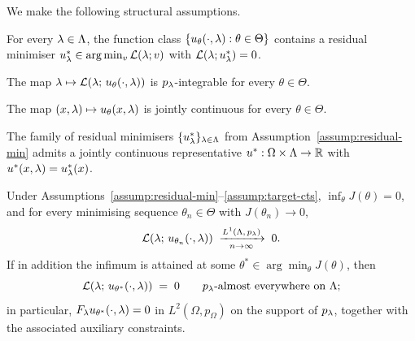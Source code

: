 \documentclass[12pt,a4paper]{extarticle}
\begin{document}
We make the following structural assumptions.

\begin{assumption}\label{assump:residual-min}
For every $\lambda \in \Lambda$, the function class $\{u_\theta(\cdot, \lambda) : \theta \in \Theta\}$ contains a residual minimiser $u_\lambda^* \in \arg\min_v \mathcal{L}(\lambda; v)$ with $\mathcal{L}(\lambda; u_\lambda^*) = 0$.
\end{assumption}

\begin{assumption}\label{assump:integrability}
The map $\lambda \mapsto \mathcal{L}(\lambda;\, u_\theta(\cdot, \lambda))$ is $p_\lambda$-integrable for every $\theta \in \Theta$.
\end{assumption}

\begin{assumption}\label{assump:joint-cts}
The map $(x, \lambda) \mapsto u_\theta(x, \lambda)$ is jointly continuous for every $\theta \in \Theta$.
\end{assumption}

\begin{assumption}\label{assump:target-cts}
The family of residual minimisers $\{u_\lambda^*\}_{\lambda \in \Lambda}$ from Assumption~\ref{assump:residual-min} admits a jointly continuous representative $u^*: \Omega \times \Lambda \to \mathbb{R}$ with $u^*(x, \lambda) = u_\lambda^*(x)$.
\end{assumption}

\begin{proposition}\label{prop:lambda-invariance}
Under Assumptions~\ref{assump:residual-min}--\ref{assump:target-cts}, $\inf_\theta J(\theta) = 0$, and for every minimising sequence $\theta_n \in \Theta$ with $J(\theta_n) \to 0$,
\begin{equation*}
    \mathcal{L}(\lambda;\, u_{\theta_n}(\cdot, \lambda)) \;\xrightarrow[n \to \infty]{L^1(\Lambda,\, p_\lambda)} \; 0.
\end{equation*}
If in addition the infimum is attained at some $\theta^* \in \arg\min_\theta J(\theta)$, then
\begin{equation*}
    \mathcal{L}(\lambda;\, u_{\theta^*}(\cdot, \lambda)) \;=\; 0
    \qquad p_\lambda\text{-almost everywhere on } \Lambda;
\end{equation*}
in particular, $F_\lambda u_{\theta^*}(\cdot, \lambda) = 0$ in $L^2(\Omega, p_\Omega)$ on the support of $p_\lambda$, together with the associated auxiliary constraints.
\end{proposition}
\end{document}
